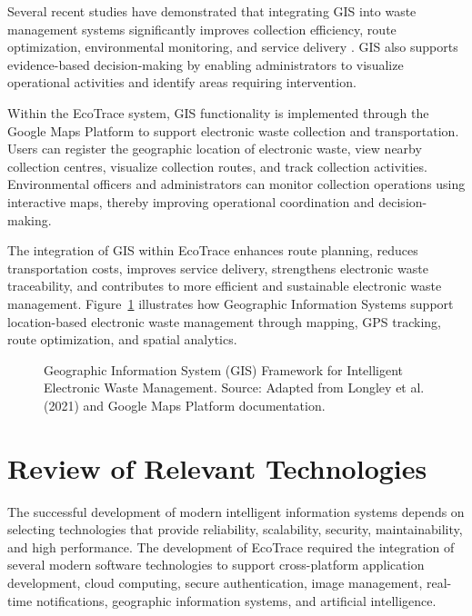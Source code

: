 Several recent studies have demonstrated that integrating GIS into waste
management systems significantly improves collection efficiency, route
optimization, environmental monitoring, and service delivery
\citep{ananth2022,belhadi2021}. GIS also supports evidence-based decision-making
by enabling administrators to visualize operational activities and identify areas
requiring intervention.

Within the EcoTrace system, GIS functionality is implemented through the
Google Maps Platform to support electronic waste collection and transportation.
Users can register the geographic location of electronic waste, view nearby
collection centres, visualize collection routes, and track collection activities.
Environmental officers and administrators can monitor collection operations using
interactive maps, thereby improving operational coordination and
decision-making.

The integration of GIS within EcoTrace enhances route planning, reduces
transportation costs, improves service delivery, strengthens electronic waste
traceability, and contributes to more efficient and sustainable electronic waste
management. Figure~\ref{fig:gis-framework} illustrates how Geographic
Information Systems support location-based electronic waste management
through mapping, GPS tracking, route optimization, and spatial analytics.

\begin{figure}[H]
  \centering
  \caption{Geographic Information System (GIS) Framework for Intelligent Electronic Waste Management. Source: Adapted from Longley et al. (2021) and Google Maps Platform documentation.}
  \label{fig:gis-framework}
\end{figure}

\section{Review of Relevant Technologies}

The successful development of modern intelligent information systems depends
on selecting technologies that provide reliability, scalability, security,
maintainability, and high performance. The development of EcoTrace required the
integration of several modern software technologies to support cross-platform
application development, cloud computing, secure authentication, image
management, real-time notifications, geographic information systems, and
artificial intelligence.


